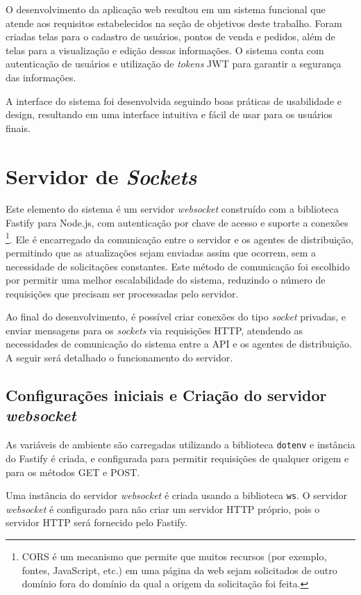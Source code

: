 O desenvolvimento da aplicação web resultou em um sistema funcional que atende aos requisitos estabelecidos na seção de objetivos deste trabalho. Foram criadas telas para o cadastro de usuários, pontos de venda e pedidos, além de telas para a visualização e edição dessas informações. O sistema conta com autenticação de usuários e utilização de \textit{tokens} JWT para garantir a segurança das informações.

A interface do sistema foi desenvolvida seguindo boas práticas de usabilidade e design, resultando em uma interface intuitiva e fácil de usar para os usuários finais.

\section{Servidor de \textit{Sockets}} \label{cap:sockets}
Este elemento do sistema é um servidor \textit{websocket} construído com a biblioteca Fastify para Node.js, com autenticação por chave de acesso e suporte a conexões \footnote{CORS é um mecanismo que permite que muitos recursos (por exemplo, fontes, JavaScript, etc.) em uma página da web sejam solicitados de outro domínio fora do domínio da qual a origem da solicitação foi feita.}. Ele é encarregado da comunicação entre o servidor e os agentes de distribuição, permitindo que as atualizações sejam enviadas assim que ocorrem, sem a necessidade de solicitações constantes. Este método de comunicação foi escolhido por permitir uma melhor escalabilidade do sistema, reduzindo o número de requisições que precisam ser processadas pelo servidor.

Ao final do desenvolvimento, é possível criar conexões do tipo \textit{socket} privadas, e enviar mensagens para os \textit{sockets} via requisições HTTP, atendendo as necessidades de comunicação do sistema entre a API e os agentes de distribuição. A seguir será detalhado o funcionamento do servidor.

\subsection{Configurações iniciais e Criação do servidor \textit{websocket}}  As variáveis de ambiente são carregadas utilizando a biblioteca \texttt{dotenv} e instância do Fastify é criada, e configurada para permitir requisições de qualquer origem e para os métodos GET e POST.

Uma instância do servidor \textit{websocket} é criada usando a biblioteca \texttt{ws}. O servidor \textit{websocket} é configurado para não criar um servidor HTTP próprio, pois o servidor HTTP será fornecido pelo Fastify.

